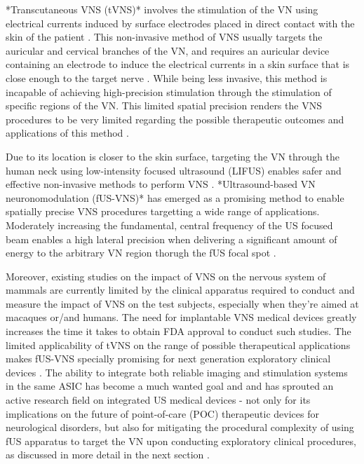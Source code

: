 \begin{figure}[ht]
  \centering
  \label{fig:transcutaneous_electrode_vns}
\end{figure}

*Transcutaneous VNS (tVNS)* involves the stimulation of the VN using electrical currents induced by surface electrodes placed in direct contact with the skin of the patient \cite{}. This non-invasive method of VNS usually targets the auricular and cervical branches of the VN, and requires an auricular device containing an electrode to induce the electrical currents in a skin surface that is close enough to the target nerve \cite{}.
While being less invasive, this method is incapable of achieving high-precision stimulation through the stimulation of specific regions of the VN. This limited spatial precision renders the VNS procedures to be very limited regarding the possible therapeutic outcomes and applications of this method \cite{}.

\begin{figure}[ht]
  \centering
  \label{fig:fus_vns}
\end{figure}

Due to its location is closer to the skin surface, targeting the VN through
the human neck using low-intensity focused ultrasound (LIFUS) enables safer and
effective non-invasive methods to perform VNS \cite{Fomenko2018, Rivandi2023, Costa2021, Costa2019}.
*Ultrasound-based VN neuronomodulation (fUS-VNS)* has emerged as a promising method to enable spatially precise VNS procedures targetting a wide range of applications. 
Moderately increasing the fundamental, central frequency of the US focused beam 
enables a high lateral precision when delivering a significant amount of energy to the 
arbitrary VN region thorugh the fUS focal spot \cite{}.

Moreover, existing studies on the impact of VNS on the nervous system of mammals are currently limited by the clinical apparatus required to conduct and measure the impact of VNS on the test subjects, especially when they're aimed at macaques or/and humans. The need for implantable VNS medical devices greatly increases the time it takes to obtain FDA approval to conduct such studies. The limited applicability of tVNS on the range of possible therapeutical applications makes fUS-VNS specially promising for next generation exploratory clinical devices \cite{}. The ability to integrate both reliable imaging and stimulation systems in the same ASIC has become a much wanted goal and and has sprouted an active research field on integrated US medical devices - not only for its implications on the future of point-of-care (POC) therapeutic devices for neurological disorders, but also for mitigating the procedural complexity of using fUS apparatus to target the VN upon conducting exploratory clinical procedures, as discussed in more detail in the next section \cite{}.

